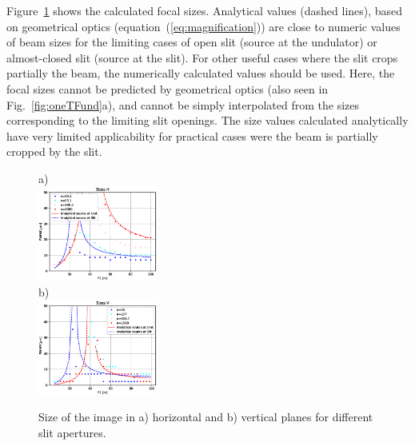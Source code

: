 \documentclass[9pt,twocolumn,twoside]{osajnl}
\begin{document}






Figure~\ref{fig:focalSizes} shows the calculated focal sizes. Analytical values (dashed lines), based on geometrical optics (equation~(\ref{eq:magnification})) are close to numeric values of beam sizes for the limiting cases of open slit (source at the undulator) or almost-closed slit (source at the slit). For other useful cases where the slit crops partially the beam, the numerically calculated values should be used. Here, the focal sizes cannot be predicted by geometrical optics (also seen in Fig.~\ref{fig:oneTFund}a), and cannot be simply interpolated from the sizes corresponding to the limiting slit openings. The size values calculated analytically have very limited applicability for practical cases were the beam is partially cropped by the slit. 




\begin{figure}[H]
a)\\
    \includegraphics[width=0.35\textwidth]{figures/sizes_h.eps}\\
b)\\
    \includegraphics[width=0.35\textwidth]{figures/sizes_v.eps}

    \caption{
    \label{fig:focalSizes}
    Size of the image in a) horizontal and b) vertical planes for different slit apertures.
    }
\end{figure}
\end{document}

